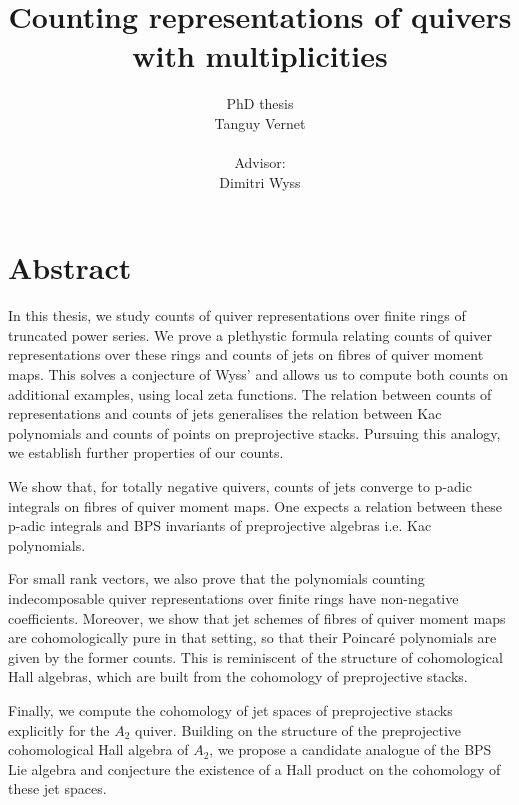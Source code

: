 \documentclass[11pt,english]{article}
\numberwithin{equation}{section}
\numberwithin{figure}{section}
\theoremstyle{definition}
\theoremstyle{plain}
\theoremstyle{remark}
\begin{document}
\title{Counting representations of quivers with multiplicities}
\author{PhD thesis \\ Tanguy Vernet \\ \\ Advisor: \\ Dimitri Wyss}

\maketitle
\pagebreak{}

\small

\tableofcontents{}

\normalsize

\pagebreak{}

\section*{Abstract}


In this thesis, we study counts of quiver representations over finite
rings of truncated power series. We prove a plethystic formula relating
counts of quiver representations over these rings and counts of jets
on fibres of quiver moment maps. This solves a conjecture of Wyss'
and allows us to compute both counts on additional examples, using
local zeta functions. The relation between counts of representations
and counts of jets generalises the relation between Kac polynomials
and counts of points on preprojective stacks. Pursuing this analogy,
we establish further properties of our counts.

We show that, for totally negative quivers, counts of jets converge
to p-adic integrals on fibres of quiver moment maps. One expects a
relation between these p-adic integrals and BPS invariants of preprojective
algebras i.e. Kac polynomials.

For small rank vectors, we also prove that the polynomials counting
indecomposable quiver representations over finite rings have non-negative
coefficients. Moreover, we show that jet schemes of fibres of quiver
moment maps are cohomologically pure in that setting, so that their
Poincaré polynomials are given by the former counts. This is reminiscent
of the structure of cohomological Hall algebras, which are built from
the cohomology of preprojective stacks.

Finally, we compute the cohomology of jet spaces of preprojective
stacks explicitly for the $A_{2}$ quiver. Building on the structure
of the preprojective cohomological Hall algebra of $A_{2}$, we propose
a candidate analogue of the BPS Lie algebra and conjecture the existence
of a Hall product on the cohomology of these jet spaces.
\end{document}
